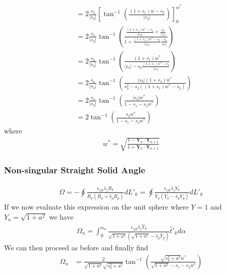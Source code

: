 \documentclass[10pt]{report}
\begin{document}
{\begin{align}
&=2\frac{s_3}{|s_3|}\left[\tan^{-1}\left(\frac{(1+s_1)w-s_2}{|s_3|}\right)\right]_0^{w^*}\nonumber\\
&=2\frac{s_3}{|s_3|}\tan^{-1}\left(\frac{\frac{(1+s_1)w^*-s_2}{|s_3|}+\frac{s_2}{|s_3|}}{1+\frac{(1+s_1)w^*-s_2}{|s_3|}\frac{-s_2}{|s_3|}}\right)\nonumber\\
&=2\frac{s_3}{|s_3|}\tan^{-1}\left(\frac{(1+s_1)w^*}{|s_3|-s_2\frac{(1+s_1)w^*-s_2}{|s_3|}}\right)\nonumber\\
&=2\frac{s_3}{|s_3|}\tan^{-1}\left(\frac{|s_3|(1+s_1)w^*}{s_3^2-s_2((1+s_1)w^*-s_2)}\right)\nonumber\\
&=2\frac{s_3}{|s_3|}\tan^{-1}\left(\frac{|s_3|w^*}{1-s_1-s_2w^*}\right)\nonumber\\
&=2\tan^{-1}\left(\frac{s_3w^*}{1-s_1-s_2w^*}\right)
\end{align}
where
\begin{align}
w^*=\sqrt{\frac{1-\bm Y_n\cdot \bm Y_{n+1}}{1+\bm Y_n\cdot \bm Y_{n+1}}}
\end{align}

\subsubsection{Non-singular Straight Solid Angle}
\begin{align}
\Omega=-\oint\frac{\epsilon_{ijk}\hat{s}_jR_k}{R_a(R_a+\hat{s}_pR_p)}dL'_k=\oint\frac{\epsilon_{ijk}\hat{s}_jY_k}{Y_a(Y_a-\hat{s}_pY_p)}dL'_k
\end{align}
If we now evaluate this expression on the unit sphere where $Y=1$ and $Y_a=\sqrt{1+a^2}$ we have
\begin{align}
\Omega_n=\int_0^{\alpha_n}\frac{\epsilon_{ijk}\hat{s}_j\hat{Y}_k}{\sqrt{1+a^2}(\sqrt{1+a^2}-\hat{s}_p\hat{Y}_p)}\hat{t}'_kd\alpha
\end{align}
We can then proceed as before and finally find
\begin{align}
\Omega_n
&=\frac{2}{\sqrt{1+a^2}\sqrt{s_3^2+a^2}}\tan^{-1}\left(\frac{\sqrt{s_3^2+a^2}w^*}{\sqrt{1+a^2}-s_1-s_2w^*}\right)
\end{align}

}
\end{document}
